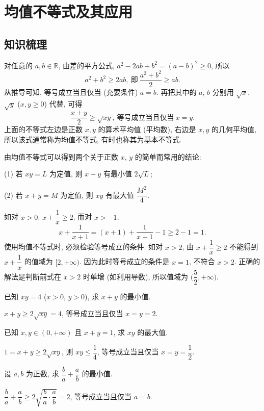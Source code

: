 
\section{均值不等式及其应用}

\subsection{知识梳理}
对任意的 $a,b\in\mathbb{R}$, 由差的平方公式, $a^2-2ab+b^2=(a-b)^2\geqslant 0$, 所以
\[a^2+b^2\geqslant 2ab,\ \text{即}\ 
    \frac{a^2+b^2}2\geqslant ab.\]
从推导可知, 等号成立当且仅当 (充要条件) $a=b$. 再把其中的 $a$, $b$ 分别用 $\sqrt{x}$, $\sqrt{y}$ ($x,y\geqslant0$) 代替, 可得
\[\frac{x+y}2\geqslant \sqrt{xy},\ \text{等号成立当且仅当}\ x=y.\]
上面的不等式左边是正数 $x,y$ 的算术平均值 (平均数), 右边是 $x,y$ 的几何平均值, 所以该式通常称为{\heiti 均值不等式}, 有时也称其为{\heiti 基本不等式}.

由均值不等式可以得到两个关于正数 $x$, $y$ 的简单而常用的结论:

(1) 若 $xy=L$ 为定值, 则 $x+y$ 有最小值 $2\sqrt{L}$;

(2) 若 $x+y=M$ 为定值, 则 $xy$ 有最大值 $\dfrac{M^2}4$.

如对 $x>0$, $x+\dfrac1x\geqslant 2$, 而对 $x>-1$,
\[x+\frac1{x+1}= (x+1)+\frac1{x+1}-1
    \geqslant 2-1=1.\]
使用均值不等式时, 必须检验等号成立的条件. 如对 $x>2$, 由 $x+\dfrac1x\geqslant 2$ 不能得到 $x+\dfrac1x$ 的值域为 $[2,+\infty)$. 因为此时等号成立的条件是 $x=1$, 不符合 $x>2$. 正确的解法是判断前式在 $x>2$ 时单增 (如利用导数), 所以值域为 $\Big(\dfrac52,+\infty\Big)$.

\lianxi
\begin{exercise}
    已知 $xy=4$ ($x>0$, $y>0$), 求 $x+y$ 的最小值.
\end{exercise}
\beginsolution
    $x+y\geqslant 2\sqrt{xy}= 4$, 等号成立当且仅当 $x=y=2$.
\endsolution

\begin{exercise}
    已知 $x, y\in(0,+\infty)$ 且 $x+y=1$, 求 $xy$ 的最大值.
\end{exercise}
\beginsolution
    $1= x+y\geqslant 2\sqrt{xy}$, 则 $xy\leqslant \dfrac14$, 等号成立当且仅当 $x=y= \dfrac12$.
\endsolution

\begin{exercise}
    设 $a,b$ 为正数, 求 $\dfrac{b}a +\dfrac{a}b$ 的最小值.
\end{exercise}
\beginsolution
    $\dfrac{b}a +\dfrac{a}b\geqslant 2\sqrt{\dfrac{b}a\cdot \dfrac{a}b}=2$, 等号成立当且仅当 $a=b$.
\endsolution

